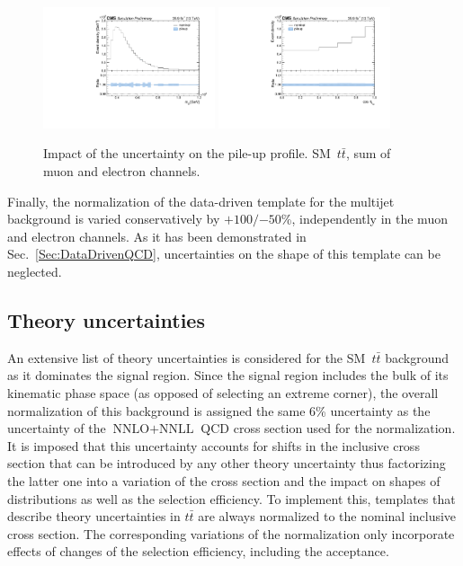 \begin{figure}
  \centering
  \includegraphics[width=0.45\textwidth]{fig/chapt7/syst/impacts/MassTT/pileup.pdf}
  \includegraphics[width=0.45\textwidth]{fig/chapt7/syst/impacts/CosTopLepTT/pileup.pdf}
  \caption{Impact of the uncertainty on the pile-up profile. SM~$t\bar t$, sum of muon and electron channels.}
  \label{Fig:SystPileup}
\end{figure}

Finally, the normalization of the data-driven template for the multijet background is varied conservatively by ${+100} / {-50}$\%, independently in the muon and electron channels.
As it has been demonstrated in Sec.~\ref{Sec:DataDrivenQCD}, uncertainties on the shape of this template can be neglected.

\subsection{Theory uncertainties}\label{subsec_theo_uncer}
%
An extensive list of theory uncertainties is considered for the SM~$t\bar t$ background as it dominates the signal region.
Since the signal region includes the bulk of its kinematic phase space (as opposed of selecting an extreme corner), the overall normalization of this background is assigned the same 6\% uncertainty as the uncertainty of the $\text{NNLO} + \text{NNLL}$ QCD cross section used for the normalization.
It is imposed that this uncertainty accounts for shifts in the inclusive cross section that can be introduced by any other theory uncertainty thus factorizing the latter one into a variation of the cross section and the impact on shapes of distributions as well as the selection efficiency.
To implement this, templates that describe theory uncertainties in $t\bar t$ are always normalized to the nominal inclusive cross section.
The corresponding variations of the normalization only incorporate effects of changes of the selection efficiency, including the acceptance.

